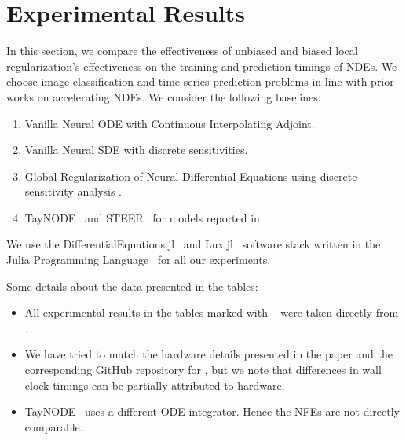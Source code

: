 \section{Experimental Results}
\label{sec:experimental_results_local_regularized_neural_des}

In this section, we compare the effectiveness of unbiased and biased local regularization's effectiveness on the training and prediction timings of NDEs. We choose image classification and time series prediction problems in line with prior works on accelerating NDEs. We consider the following baselines:
%
\begin{enumerate}
  \item Vanilla Neural ODE with Continuous Interpolating Adjoint.

  \item Vanilla Neural SDE with discrete sensitivities.

  \item Global Regularization of Neural Differential Equations using discrete sensitivity analysis \citep{pal2021opening}.

  \item TayNODE~\citep{kelly2020learning} and STEER~\citep{ghosh2020steer} for models reported in \citet{pal2021opening}.
\end{enumerate}
%

We use the DifferentialEquations.jl~\citep{rackauckas2019diffeqflux} and Lux.jl~\citep{pal2022lux} software stack written in the Julia Programming Language~\citep{Julia-2017} for all our experiments.

Some details about the data presented in the tables:
%
\begin{itemize}
  \item All experimental results in the tables marked with \textparagraph~ were taken directly from \citet{pal2021opening}.

  \item We have tried to match the hardware details presented in the paper and the corresponding GitHub repository for \citet{pal2021opening}, but we note that differences in wall clock timings can be partially attributed to hardware.

  \item TayNODE~\citep{kelly2020learning} uses a different ODE integrator. Hence the NFEs are not directly comparable.
\end{itemize}
%

